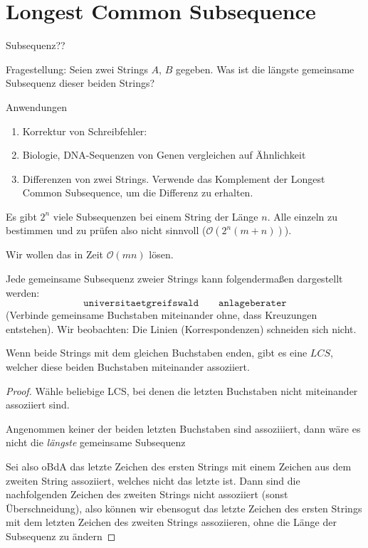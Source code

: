 \documentclass[11pt]{scrbook}
\renewcommand{\O}{\mathcal{O}}
\begin{document}
\section{Longest Common Subsequence}

\begin{df}[Subsequenz]
	Subsequenz??
\end{df}

\begin{seg}{Fragestellung:}
	Seien zwei Strings $A$, $B$ gegeben.
	Was ist die längste gemeinsame Subsequenz dieser beiden Strings?
\end{seg}

\begin{seg}{Anwendungen}
	\begin{enumerate}
		\item
			Korrektur von Schreibfehler:
		\item
			Biologie, DNA-Sequenzen von Genen vergleichen auf Ähnlichkeit
		\item
			Differenzen von zwei Strings.
			Verwende das Komplement der Longest Common Subsequence, um die Differenz zu erhalten.
	\end{enumerate}
\end{seg}

Es gibt $2^n$ viele Subsequenzen bei einem String der Länge $n$.
Alle einzeln zu bestimmen und zu prüfen also nicht sinnvoll ($\O(2^n(m+n))$).

Wir wollen das in Zeit $\O(mn)$ lösen.

Jede gemeinsame Subsequenz zweier Strings kann folgendermaßen dargestellt werden:
\[
	\texttt{universitaetgreifswald} \qquad \texttt{anlageberater}
\]
(Verbinde gemeinsame Buchstaben miteinander ohne, dass Kreuzungen entstehen).
Wir beobachten: Die Linien (Korrespondenzen) schneiden sich nicht.

\begin{st}
	Wenn beide Strings mit dem gleichen Buchstaben enden, gibt es eine $LCS$, welcher diese beiden Buchstaben miteinander assoziiert.
	\begin{proof}
		Wähle beliebige LCS, bei denen die letzten Buchstaben nicht miteinander assoziiert sind.

		Angenommen keiner der beiden letzten Buchstaben sind assoziiiert, dann wäre es nicht die \emph{längste} gemeinsame Subsequenz

		Sei also oBdA das letzte Zeichen des ersten Strings mit einem Zeichen aus dem zweiten String assoziiert, welches nicht das letzte ist.
		Dann sind die nachfolgenden Zeichen des zweiten Strings nicht assoziiert (sonst Überschneidung), also können wir ebensogut das letzte Zeichen des ersten Strings mit dem letzten Zeichen des zweiten Strings assoziieren, ohne die Länge der Subsequenz zu ändern
	\end{proof}
\end{st}
\end{document}
